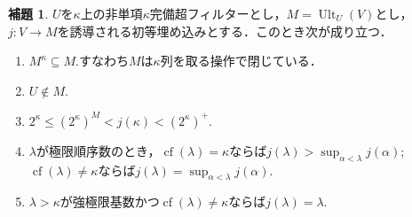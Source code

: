 \documentclass[uplatex]{jsarticle}
\newcommand{\cf}{\operatorname{cf}}
\newcommand{\Ult}{\operatorname{Ult}}
\renewcommand\subset{\subseteq}
\theoremstyle{definition}
\newtheorem{lem}[thm]{補題}
\begin{document}
	\begin{lem}\label{lem:kappaseq}
		$U$を$\kappa$上の非単項$\kappa$完備超フィルターとし，$M = \Ult_U(V)$とし，$j \colon V \to M$を誘導される初等埋め込みとする．このとき次が成り立つ．
		\begin{enumerate}
			\item $M^\kappa \subset M$.すなわち$M$は$\kappa$列を取る操作で閉じている．
			\item $U \not \in M$.
			\item $2^\kappa \le (2^\kappa)^M < j(\kappa) < (2^\kappa)^+$.
			\item $\lambda$が極限順序数のとき，$\cf(\lambda) = \kappa$ならば$j(\lambda) > \sup_{\alpha < \lambda} j(\alpha)$; $\cf(\lambda) \ne \kappa$ならば$j(\lambda) = \sup_{\alpha < \lambda} j(\alpha)$.
			\item $\lambda > \kappa$が強極限基数かつ$\cf(\lambda) \ne \kappa$ならば$j(\lambda) = \lambda$.
		\end{enumerate}
	\end{lem}
\end{document}

